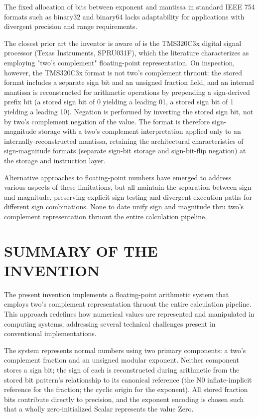 \documentclass[12pt,letter]{article}
\begin{document}
The fixed allocation of bits between exponent and mantissa in standard IEEE 754 formats such as binary32 and binary64 lacks adaptability for applications with divergent precision and range requirements.

The closest prior art the inventor is aware of is the TMS320C3x digital signal processor (Texas Instruments, SPRU031F), which the literature characterizes as employing "two's complement" floating-point representation. On inspection, however, the TMS320C3x format is not two's complement thruout: the stored format includes a separate sign bit and an unsigned fraction field, and an internal mantissa is reconstructed for arithmetic operations by prepending a sign-derived prefix bit (a stored sign bit of 0 yielding a leading 01, a stored sign bit of 1 yielding a leading 10). Negation is performed by inverting the stored sign bit, not by two's complement negation of the value. The format is therefore sign-magnitude storage with a two's complement interpretation applied only to an internally-reconstructed mantissa, retaining the architectural characteristics of sign-magnitude formats (separate sign-bit storage and sign-bit-flip negation) at the storage and instruction layer.

Alternative approaches to floating-point numbers have emerged to address various aspects of these limitations, but all maintain the separation between sign and magnitude, preserving explicit sign testing and divergent execution paths for different sign combinations. None to date unify sign and magnitude thru two's complement representation thruout the entire calculation pipeline.


\section{SUMMARY OF THE INVENTION}

The present invention implements a floating-point arithmetic system that employs two's complement representation thruout the entire calculation pipeline. This approach redefines how numerical values are represented and manipulated in computing systems, addressing several technical challenges present in conventional implementations.

The system represents normal numbers using two primary components: a two's complement fraction and an unsigned modular exponent. Neither component stores a sign bit; the sign of each is reconstructed during arithmetic from the stored bit pattern's relationship to its canonical reference (the N0 inflate-implicit reference for the fraction; the cyclic origin for the exponent). All stored fraction bits contribute directly to precision, and the exponent encoding is chosen such that a wholly zero-initialized Scalar represents the value Zero.
\end{document}
